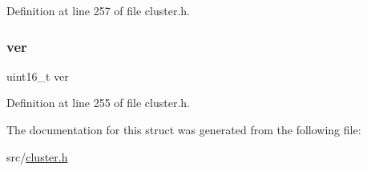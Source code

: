 Definition at line 257 of file cluster.\+h.

\mbox{\label{structcluster_msg_aa10697fa6dc414fbc83710764c48899b}} 
\subsubsection{\texorpdfstring{ver}{ver}}
{\footnotesize\ttfamily uint16\+\_\+t ver}



Definition at line 255 of file cluster.\+h.



The documentation for this struct was generated from the following file\+:\begin{DoxyCompactItemize}
\item 
src/\hyperlink{cluster_8h}{cluster.\+h}\end{DoxyCompactItemize}
